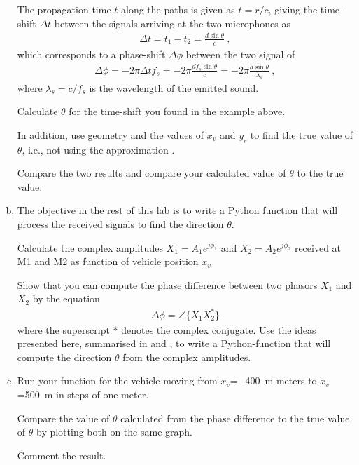 \begin{enumerate}[a)]
	The propagation time $t$ along the paths is given as $t=r/c$, giving the time-shift $\Delta t$ between the signals arriving at the two microphones as
	\begin{align}
		\Delta t = t_1-t_2 = \frac{d \sin\theta }{c} \:,
	\end{align}
	which corresponds to a phase-shift $\Delta \phi$ between the two signal of
	\begin{align}
		\Delta \phi = -2\pi \Delta t f_s = -2 \pi \frac{d f_s \sin\theta }{c} 
		= -2 \pi \frac{d \sin\theta }{\lambda_s}\:,
		\label{eq:phaseshift-approximated}
	\end{align}
	where $\lambda_s=c/f_s$ is the wavelength of the emitted sound.
	
	Calculate $\theta$ for the time-shift you found in the example above.
	
	In addition, use geometry and the values of $x_v$ and $y_r$ to find the true value of $\theta$, i.e., not using the approximation . 
	
	Compare the two results and compare your calculated value of $\theta$ to the true value.
	
	\item The objective in the rest of this lab is to write a Python function that will process the received signals to find the direction $\theta$. 
	
	Calculate the complex amplitudes $X_1 = A_1 e^{j\phi_1}$ and $X_2 = A_2 e^{j\phi_2}$ received at M1 and M2 as function of vehicle position $x_v$
	
	Show that you can compute the phase difference between two phasors $X_1$ and $X_2$ by the equation
	\begin{align*}
		\Delta \phi = \angle \{ X_1 X_2^* \}
	\end{align*}
	where the superscript * denotes the complex conjugate. Use the ideas presented here, summarised in  and , to write a Python-function that will compute the direction $\theta$ from the complex amplitudes.
		
	\item Run your function for the vehicle moving from $x_v$=\qty{-400}{m} meters to  $x_v$=\qty{+500}{m} in steps of one meter.
	
	Compare the value of $\theta$ calculated from the phase difference to the true value of $\theta$ by plotting both on the same graph.
	
	Comment the result.
		
\end{enumerate}



